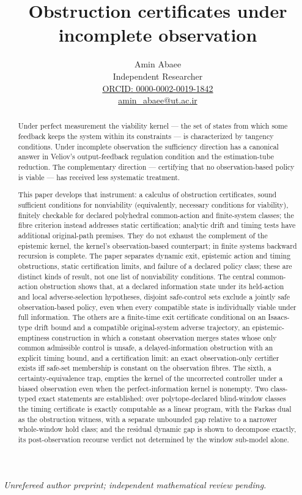 \documentclass[10pt,twocolumn]{article}
\title{Obstruction certificates under incomplete observation}
\author{Amin Abaee\\[0.35em]
{\small Independent Researcher}\\[0.55em]
{\small\href{https://orcid.org/0000-0002-0019-1842}{ORCID: 0000-0002-0019-1842}}\\[0.3em]
{\small\href{mailto:amin\_abaee@ut.ac.ir}{amin\_abaee@ut.ac.ir}}}
\theoremstyle{definition}
\begin{document}
\maketitle
\begin{center}\small\emph{Unrefereed author preprint; independent mathematical review pending.}\end{center}

\begin{abstract}

Under perfect measurement the viability kernel --- the set of states
from which some feedback keeps the system within its constraints --- is
characterized by tangency conditions. Under incomplete observation the
sufficiency direction has a canonical answer in Veliov's
output-feedback regulation condition and the estimation-tube reduction.
The complementary direction --- certifying that no observation-based
policy is viable --- has received less systematic treatment.

This paper develops that instrument: a calculus of obstruction
certificates, sound sufficient conditions for nonviability (equivalently, necessary conditions for viability), finitely
checkable for declared polyhedral common-action and finite-system classes; the fibre criterion instead addresses static certification; analytic drift and timing tests have additional original-path premises. They do not exhaust the complement of the epistemic kernel, the kernel's observation-based counterpart; in finite systems backward recursion is complete. The paper separates dynamic exit, epistemic action and timing
obstructions, static certification limits, and failure of a declared
policy class; these are distinct kinds of result, not one list of
nonviability conditions. The central common-action obstruction shows that, at a declared
information state under its held-action and local adverse-selection
hypotheses, disjoint safe-control sets exclude a jointly safe
observation-based policy, even when every compatible state is
individually viable under full information. The others are a finite-time
exit certificate conditional on an Isaacs-type drift bound and a compatible original-system adverse trajectory, an
epistemic-emptiness construction in which a constant observation merges
states whose only common admissible control is unsafe, a delayed-information
obstruction with an explicit timing bound, and a certification limit:
an exact observation-only certifier exists iff safe-set
membership is constant on the observation fibres. The sixth, a
certainty-equivalence trap, empties the kernel of the uncorrected controller under a biased
observation even when the perfect-information kernel is nonempty.
Two class-typed exact statements are established: over polytope-declared
blind-window classes the timing certificate is exactly computable as a linear
program, with the Farkas dual as the obstruction witness, with a separate unbounded gap relative to a narrower whole-window hold class; and the residual dynamic
gap is shown to decompose exactly, its post-observation recourse verdict not determined by the window sub-model
alone.


\end{abstract}
\end{document}
